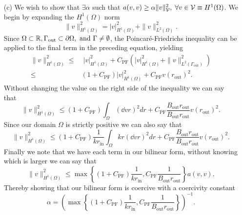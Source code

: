 \documentclass{article}
\begin{document}
\begin{itemize}
	\item[(c)] We wish to show that \(\exists\alpha \) such that \(a(v,v) \geq \alpha\|v\|^2_{\mathcal{V}}, \; \forall v \in \mathcal{V} \equiv H^1(\Omega) \). We begin by expanding the \(H^1\left(\Omega\right)\) norm
	\begin{equation}
		\|v\|^2_{H^1(\Omega)} = |v|^2_{H^1(\Omega)} + \|v\|^2_{L^2(\Omega)}.
	\end{equation}
	Since \(\Omega \subset \mathbb{R}, \Gamma_\text{out} \subset \partial\Omega, \text{ and } \Gamma \neq \emptyset\), the Poincar\'e-Friedrichs inequality can be applied to the final term in the preceding equation, yielding
	\begin{align}
		\|v\|^2_{H^1(\Omega)} \leq& \;|v|^2_{H^1(\Omega)} + C_\text{PF}\left(|v|^2_{H^1(\Omega)} + \|v\|^2_{L^2(\Gamma_\text{out})}  \right)\\
		\leq& \left(1+C_\text{PF}\right) |v|^2_{H^1(\Omega)} + C_\text{PF}v(r_\text{out})^2.
	\end{align}
	Without changing the value on the right side of the inequality we can say that 
	\begin{equation}
		\|v\|^2_{H^1(\Omega)} \leq \left(1+C_\text{PF}\right) \int_\Omega \left(\dd{v}{r}\right)^2 dr + C_\text{PF}\dfrac{B_\text{out}r_\text{out}} {B_\text{out}r_\text{out}}v(r_\text{out})^2.
	\end{equation}
	Since our domain \(\Omega \) is strictly positive we can also say that
	\begin{equation}
		\|v\|^2_{H^1(\Omega)} \leq \left(1+C_\text{PF}\right) \dfrac{1}{kr_\text{in}}\int_\Omega kr\left(\dd{v}{r}\right)^2 dr + C_\text{PF}\dfrac{B_\text{out}r_\text{out}} {B_\text{out}r_\text{out}}v(r_\text{out})^2.
	\end{equation}
	Finally we note that we have each term in our bilinear form, without knowing which is larger we can say that
	\begin{equation}
		\|v\|^2_{H^1(\Omega)} \leq \max\left\{\left(1+C_\text{PF}\right) \dfrac{1}{kr_\text{in}} , C_\text{PF}\dfrac{1} {B_\text{out}r_\text{out}}\right\}a(v,v).
	\end{equation}
	Thereby showing that our bilinear form is coercive with a coercivity constant
	\begin{equation}
		\alpha = \left(\max\left\{\left(1+C_\text{PF}\right) \dfrac{1}{kr_\text{in}} , C_\text{PF}\dfrac{1} {B_\text{out}r_\text{out}}\right\} \right)^{-1}.
	\end{equation}
	

\end{itemize}
\end{document}

